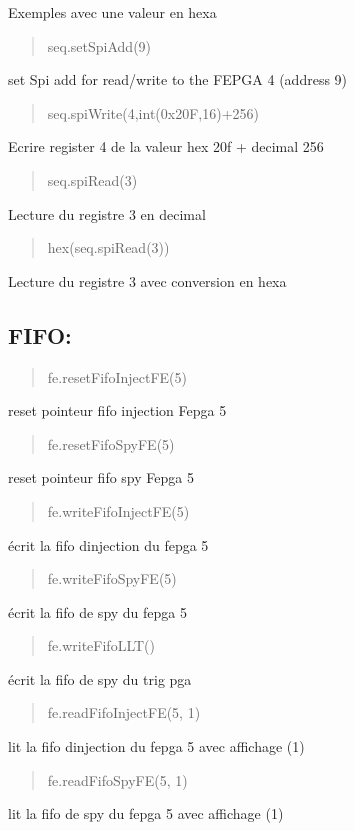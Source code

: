 Exemples avec une valeur en hexa

\begin{quote}
seq.\+set\+Spi\+Add(9) \end{quote}
set Spi add for read/write to the F\+E\+P\+GA 4 (address 9)

\begin{quote}
seq.\+spi\+Write(4,int(\textquotesingle{}0x20F\textquotesingle{},16)+256) \end{quote}
Ecrire register 4 de la valeur hex 20f + decimal 256

\begin{quote}
seq.\+spi\+Read(3) \end{quote}
Lecture du registre 3 en decimal

\begin{quote}
hex(seq.\+spi\+Read(3)) \end{quote}
Lecture du registre 3 avec conversion en hexa

\subsection*{F\+I\+FO\+: }

\begin{quote}
fe.\+reset\+Fifo\+Inject\+F\+E(5) \end{quote}
reset pointeur fifo injection Fepga 5

\begin{quote}
fe.\+reset\+Fifo\+Spy\+F\+E(5) \end{quote}
reset pointeur fifo spy Fepga 5

\begin{quote}
fe.\+write\+Fifo\+Inject\+F\+E(5) \end{quote}
écrit la fifo d\textquotesingle{}injection du fepga 5

\begin{quote}
fe.\+write\+Fifo\+Spy\+F\+E(5) \end{quote}
écrit la fifo de spy du fepga 5

\begin{quote}
fe.\+write\+Fifo\+L\+L\+T() \end{quote}
écrit la fifo de spy du trig pga

\begin{quote}
fe.\+read\+Fifo\+Inject\+F\+E(5, 1) \end{quote}
lit la fifo d\textquotesingle{}injection du fepga 5 avec affichage (1)

\begin{quote}
fe.\+read\+Fifo\+Spy\+F\+E(5, 1) \end{quote}
lit la fifo de spy du fepga 5 avec affichage (1)

